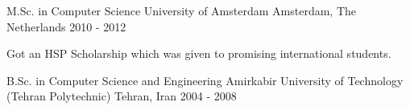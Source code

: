 

\begin{cventries}

  \cventry
    {M.Sc. in Computer Science} %
    {University of Amsterdam} %
    {Amsterdam, The Netherlands} %
    {2010 - 2012} %
    {
      \begin{cvitems} %
        \item {Got an HSP Scholarship which was given to promising international students.}
      \end{cvitems}
    }

  \cventry
    {B.Sc. in Computer Science and Engineering} %
    {Amirkabir University of Technology (Tehran Polytechnic)} %
    {Tehran, Iran} %
    {2004 - 2008} %
    {}

\end{cventries}
